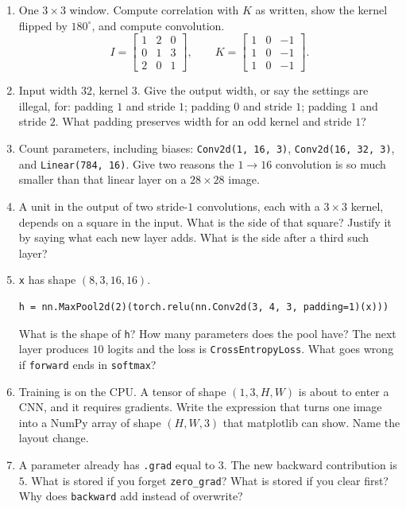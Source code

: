 \documentclass[11pt]{article}
\begin{document}
\begin{enumerate}
\item One $3\times 3$ window. Compute correlation with $K$ as written, show the kernel flipped by $180^\circ$, and compute convolution.
\[
I=\begin{bmatrix} 1&2&0\\ 0&1&3\\ 2&0&1 \end{bmatrix},
\qquad
K=\begin{bmatrix} 1&0&-1\\ 1&0&-1\\ 1&0&-1 \end{bmatrix}.
\]

\item Input width $32$, kernel $3$. Give the output width, or say the settings are illegal, for: padding $1$ and stride $1$; padding $0$ and stride $1$; padding $1$ and stride $2$. What padding preserves width for an odd kernel and stride $1$?

\item Count parameters, including biases: \texttt{Conv2d(1, 16, 3)}, \texttt{Conv2d(16, 32, 3)}, and \texttt{Linear(784, 16)}. Give two reasons the $1\to 16$ convolution is so much smaller than that linear layer on a $28\times 28$ image.

\item A unit in the output of two stride-$1$ convolutions, each with a $3\times 3$ kernel, depends on a square in the input. What is the side of that square? Justify it by saying what each new layer adds. What is the side after a third such layer?

\item \texttt{x} has shape $(8,3,16,16)$.
\begin{verbatim}
h = nn.MaxPool2d(2)(torch.relu(nn.Conv2d(3, 4, 3, padding=1)(x)))
\end{verbatim}
What is the shape of \texttt{h}? How many parameters does the pool have? The next layer produces $10$ logits and the loss is \texttt{CrossEntropyLoss}. What goes wrong if \texttt{forward} ends in \texttt{softmax}?

\item Training is on the CPU. A tensor of shape $(1,3,H,W)$ is about to enter a CNN, and it requires gradients. Write the expression that turns one image into a NumPy array of shape $(H,W,3)$ that matplotlib can show. Name the layout change.

\item A parameter already has \texttt{.grad} equal to $3$. The new backward contribution is $5$. What is stored if you forget \texttt{zero\_grad}? What is stored if you clear first? Why does \texttt{backward} add instead of overwrite?


\end{enumerate}
\end{document}
